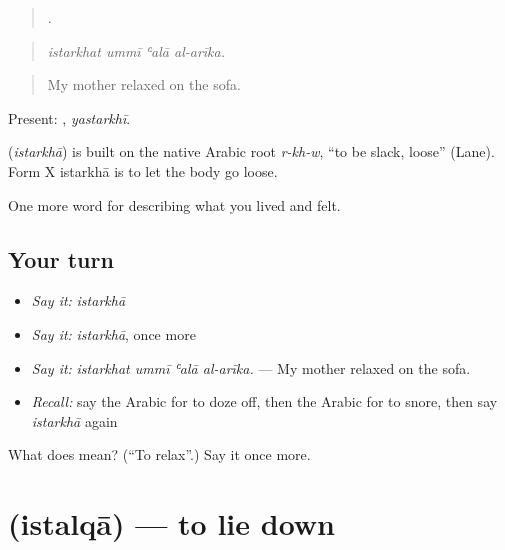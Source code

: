 \begin{quote}
   .
\end{quote}

\begin{quote}
\emph{istarkhat ummī ʿalā al-arīka.}
\end{quote}

\begin{quote}
My mother relaxed on the sofa.
\end{quote}

Present: , \emph{yastarkhī}.

\begin{cousinweb}
\textbf{} (\emph{istarkhā}) is built on the native Arabic root \emph{r-kh-w}, \textquotedblleft{}to be slack, loose\textquotedblright{} (Lane). Form X istarkhā is to let the body go loose.
\end{cousinweb}

\begin{grammarlens}[title={What you've built}]
One more word for describing what you lived and felt.
\end{grammarlens}

\subsection*{Your turn}
\begin{itemize}
\raggedright
  \item \emph{Say it:} \emph{istarkhā}
  \item \emph{Say it:} \emph{istarkhā}, once more
  \item \emph{Say it:} \emph{istarkhat ummī ʿalā al-arīka.} — My mother relaxed on the sofa.
  \item \emph{Recall:} say the Arabic for to doze off, then the Arabic for to snore, then say \emph{istarkhā} again
\end{itemize}

\begin{tcolorbox}[breakable,colback=teal!4,colframe=teal!35!black,title={Before you move on}]
What does  mean? (\textquotedblleft{}To relax\textquotedblright{}.) Say it once more.
\end{tcolorbox}
\section[\texorpdfstring{\ar{استلقى} (istalqā)}{استلقى (istalqā)}]{ (istalqā) — to lie down}

